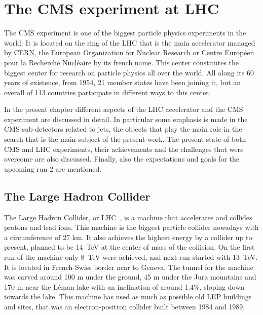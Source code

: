 \chapter[The CMS experiment at LHC]{The CMS experiment at LHC}

The CMS experiment is one of the biggest particle physics experiments in the world. It is located on the ring of the LHC that is the main accelerator managed by CERN, the European Organization for Nuclear Research or Centre Europ\'{e}en pour la Recherche Nucl\'{e}aire by its french name. This center constitutes the biggest center for research on particle physics all over the world. All along its 60 years of existence, from 1954, 21 member states have been joining it, but an overall of 113 countries participate in different ways to this center. 

In the present chapter different aspects of the LHC accelerator and the CMS experiment are discussed in detail. In particular some emphasis is made in the CMS sub-detectors related to jets, the objects that play the main role in the search that is the main subject of the present work. The present state of both CMS and LHC experiments, their achievements and the challenges that were overcome are also discussed. Finally, also the expectations and goals for the upcoming run 2 are mentioned.  

\section{The Large Hadron Collider}
\label{sec:LHC}

The Large Hadron Collider, or LHC~\cite{Bruning:782076}, is a machine that accelerates and collides protons and lead ions. This machine is the biggest particle collider nowadays with a circumference of 27 km. It also achieves the highest energy by a collider up to present, planned to be 14~TeV at the center of mass of the collision. On the first run of the machine only 8~TeV were achieved, and next run started with 13~TeV. It is located in French-Swiss border near to Geneva. The tunnel for the machine was carved around 100 m under the ground, 45 m under the Jura mountains and 170 m near the L\'{e}man lake with an inclination of around 1.4\%, sloping down towards the lake. This machine has used as much as possible old LEP buildings and sites, that was an electron-positron collider built between 1984 and 1989. 


